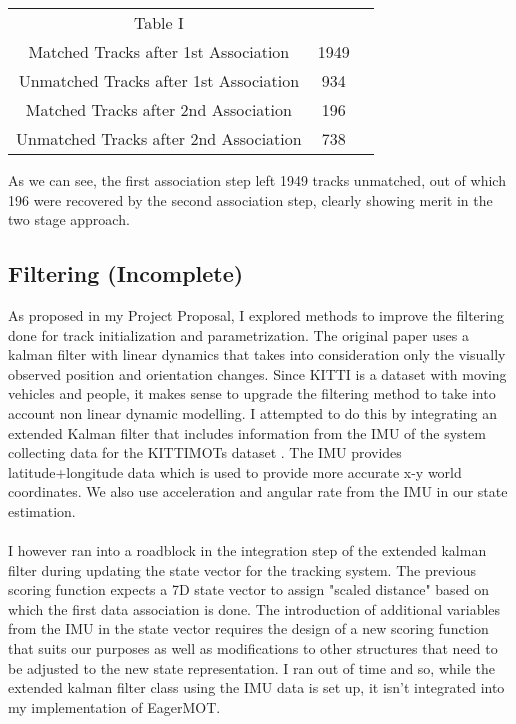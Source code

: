 \documentclass{article}
\begin{document}
\begin{center}
\begin{tabular}{ c c c }
 Table I \\ 
 Matched Tracks after 1st Association &  1949\\  
Unmatched Tracks after 1st Association& 934 &\\ 
Matched Tracks after 2nd Association & 196\\
Unmatched Tracks after 2nd Association & 738
\end{tabular}
\end{center}

As we can see, the first association step left 1949 tracks unmatched, out of which 196 were recovered by the second association step, clearly showing merit in the two stage approach.


\subsection{Filtering (Incomplete)}
As proposed in my Project Proposal, I explored methods to improve the filtering done for track initialization and parametrization. The original paper \cite{Kim21ICRA} uses a kalman filter with linear dynamics that takes into consideration only the visually observed position and orientation changes. Since KITTI is a dataset with moving vehicles and people, it makes sense to upgrade the filtering method to take into account non linear dynamic modelling. I attempted to do this by integrating an extended Kalman filter that includes information from the IMU of the system collecting data for the KITTIMOTs dataset \cite{Geiger2012CVPR}. The IMU provides latitude+longitude data which is used to provide more accurate x-y world coordinates. We also use acceleration and angular rate from the IMU in our state estimation.\\\\
I however ran into a roadblock in the integration step of the extended kalman filter during updating the state vector for the tracking system. The previous scoring function expects a 7D state vector to assign "scaled distance" based on which the first data association is done. The introduction of additional variables from the IMU in the state vector requires the design of a new scoring function that suits our purposes as well as modifications to other structures that need to be adjusted to the new state representation. I ran out of time and so, while the extended kalman filter class using the IMU data is set up, it isn't integrated into my implementation of EagerMOT.
\end{document}
